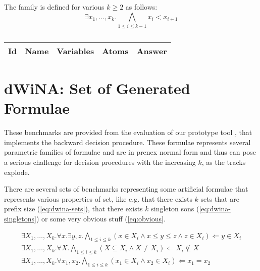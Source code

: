 The family is defined for various $k \geq 2$ as follows:
\begin{equation}
 \exists x_1,\ldots,x_k. \bigwedge_{1 \leq i \leq k - 1} x_i < x_{i+1}
\end{equation}

\begin{table}
  \caption{}{\label{tab:bench-uabe}}
  \begin{tabular}{l l r r r}
  \hline
  \textbf{Id} & \textbf{Name} & \textbf{Variables} & \textbf{Atoms} & \textbf{Answer} \\
  \hline
  \hline
  
  \hline
  \end{tabular}
\end{table}

\section{dWiNA: Set of Generated Formulae}

These benchmarks are provided from the evaluation of our prototype tool \dwina, that implements the
backward decision procedure. These formulae represents several parametric families of formulae
and are in prenex normal form and thus can pose a serious challenge for decision procedures with
the increasing $k$, as the tracks explode.

There are several sets of benchmarks representing some artificial formulae that represents various
properties of set, like e.g. that there exists $k$ sets that are prefix size (\ref{eq:dwina-sets}),
that there exists $k$ singleton sons (\ref{eq:dwina-singletons}) or some very obvious stuff (\ref{eq:obvious}.

\begin{eqnarray}
  \exists X_1,\ldots, X_k. \forall x. \exists y, z. \bigwedge_{1 \leq i \leq k} 
   (x \in X_i \wedge x \leq y \leq z \wedge z \in X_i) \Leftarrow y \in X_i\\
  \exists X_1,\ldots, X_k. \forall X. \bigwedge_{1 \leq i \leq k} (X \subseteq X_i \wedge X \neq X_i)
    \Leftarrow X_i \not\subseteq X\\
  \exists X_1,\ldots, X_k. \forall x_1, x_2. \bigwedge_{1 \leq i \leq k}
   (x_1 \in X_i \wedge x_2 \in X_i) \Leftarrow x_1 = x_2
\end{eqnarray}
